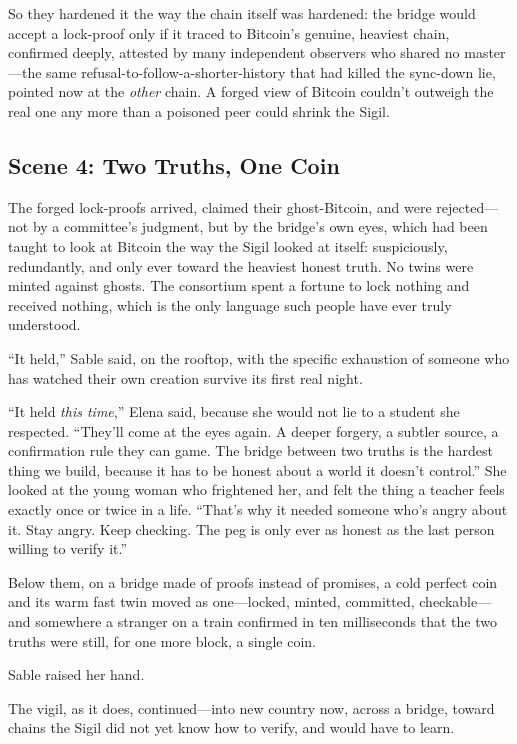 \documentclass[12pt,letterpaper]{book}
\begin{document}
So they hardened it the way the chain itself was hardened: the bridge would accept
a lock-proof only if it traced to Bitcoin's genuine, heaviest chain, confirmed
deeply, attested by many independent observers who shared no master---the same
refusal-to-follow-a-shorter-history that had killed the sync-down lie, pointed
now at the \emph{other} chain. A forged view of Bitcoin couldn't outweigh the real
one any more than a poisoned peer could shrink the Sigil.

\hypertarget{scene-4-two-truths-one-coin}{%
\subsection{Scene 4: Two Truths, One
Coin}\label{scene-4-two-truths-one-coin}}

The forged lock-proofs arrived, claimed their ghost-Bitcoin, and were rejected---
not by a committee's judgment, but by the bridge's own eyes, which had been taught
to look at Bitcoin the way the Sigil looked at itself: suspiciously, redundantly,
and only ever toward the heaviest honest truth. No twins were minted against
ghosts. The consortium spent a fortune to lock nothing and received nothing, which
is the only language such people have ever truly understood.

``It held,'' Sable said, on the rooftop, with the specific exhaustion of someone
who has watched their own creation survive its first real night.

``It held \emph{this time},'' Elena said, because she would not lie to a student
she respected. ``They'll come at the eyes again. A deeper forgery, a subtler
source, a confirmation rule they can game. The bridge between two truths is the
hardest thing we build, because it has to be honest about a world it doesn't
control.'' She looked at the young woman who frightened her, and felt the thing a
teacher feels exactly once or twice in a life. ``That's why it needed someone who's
angry about it. Stay angry. Keep checking. The peg is only ever as honest as the
last person willing to verify it.''

Below them, on a bridge made of proofs instead of promises, a cold perfect coin
and its warm fast twin moved as one---locked, minted, committed, checkable---and
somewhere a stranger on a train confirmed in ten milliseconds that the two truths
were still, for one more block, a single coin.

Sable raised her hand.

The vigil, as it does, continued---into new country now, across a bridge, toward
chains the Sigil did not yet know how to verify, and would have to learn.
\end{document}
